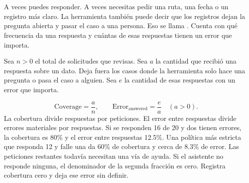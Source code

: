 \section{}
\label{sec:release}

{A veces puedes responder. A veces necesitas pedir una ruta, una fecha o un registro más claro. La herramienta también puede decir que los registros dejan la pregunta abierta y pasar el caso a una persona. Eso se llama . Cuenta con qué frecuencia da una respuesta y cuántas de esas respuestas tienen un error que importa.

Sea \(n>0\) el total de solicitudes que revisas. Sea \(a\) la cantidad que recibió una respuesta sobre un dato. Deja fuera los casos donde la herramienta solo hace una pregunta o pasa el caso a alguien. Sea \(e\) la cantidad de esas respuestas con un error que importa.}
\begin{equation}
 \mathrm{Coverage}=\frac{a}{n},\qquad
 \mathrm{Error}_{\mathrm{answered}}=\frac{e}{a}\quad(a>0).
 \label{eq:coverage}
\end{equation}
{La cobertura divide respuestas por peticiones. El error entre respuestas divide errores materiales por respuestas. Si se responden 16 de 20 y dos tienen errores, la cobertura es 80\% y el error entre respuestas 12.5\%. Una política más estricta que responda 12 y falle una da 60\% de cobertura y cerca de 8.3\% de error. Las peticiones restantes todavía necesitan una vía de ayuda. Si el asistente no responde ninguna, el denominador de la segunda fracción es cero. Registra cobertura cero y deja ese error sin definir.}

